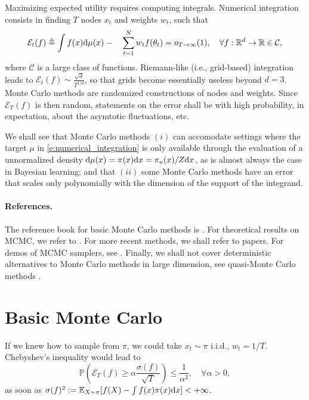 Maximizing expected utility requires computing integrals. 
Numerical integration consists in finding $T$ nodes $x_t$ and weights $w_t$, such
that
$$
{\mathcal{E}_t(f)} \triangleq  \int f(x)\mathrm{d}\mu(x)  - \quad \sum_{t=1}^N w_t f(\theta_t) = o_{T\rightarrow \infty}(1), \quad \forall
f:\mathbb{R}^d\rightarrow\mathbb{R}\in\mathcal C,
$$
where $\mathcal C$ is a large class of functions.
Riemann-like (i.e., grid-based) integration leads to $\mathcal{E}_t(f) \sim \frac{\sqrt{d}}{T^{1/d}}$, so that grids become essentially useless beyond $d=3$.
Monte Carlo methods are randomized constructions of nodes and weights. 
Since $\mathcal{E}_T(f)$ is then random, statements on the error shall be with high probability, in expectation, about the asymtotic fluctuations, etc.

We shall see that Monte Carlo methods $(i)$ can accomodate settings where the target $\mu$ in \eqref{e:numerical_integration} is only available through the evaluation of a unnormalized density $\mathrm{d}\mu(x) = \pi(x)\mathrm{d} x = \pi_u(x)/Z\mathrm{d} x$, as is almost always the case in Bayesian learning; and that $(ii)$ some Monte Carlo methods have an error that scales only polynomially with the dimension of the support of the integrand.

\paragraph{References.} 
The reference book for basic Monte Carlo methods is \citep{RoCa04}. 
For theoretical results on MCMC, we refer to \citep[Chapters 5 to 7]{DoMoSt14}. 
For more recent methods, we shall refer to papers.
For demos of MCMC samplers, see \cfdemo.
Finally, we shall not cover deterministic alternatives to Monte Carlo methods in large dimension, see quasi-Monte Carlo methods \citep{DiPi10}.

\section{Basic Monte Carlo}

If we knew how to sample from $\pi$, we could take $x_t\sim\pi$ i.i.d., $w_t=1/T$.
Chebyshev's inequality would lead to
  $$ \mathbb{P}\left({\mathcal{E}_T(f)} \geq \alpha\frac{\sigma(f)}{\sqrt{T}} \right) \leq \frac{1}{\alpha^2}, \quad \forall \alpha>0,$$
  as soon as $\sigma(f)^2 := \mathbb{E}_{X\sim\pi} [f(X) - \int f(x)\pi(x)\mathrm{d} x]<+\infty$.

